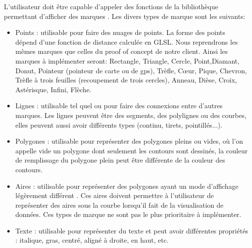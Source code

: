 \documentclass[12pt]{article}
\begin{document}
L'utilisateur doit être capable d'appeler des fonctions de la bibliothèque permettant d'afficher des
\gls{marque}s \cite{VegaMarks}. Les divers types de marque sont les suivants:
	\begin{itemize}
	\item Points : utilisable pour faire des nuages de points. La forme des points dépend d'une fonction de
    distance calculée en GLSL. Nous reprendrons les mêmes marques que celles du proof of concept de notre client.
    Ainsi les marques à implémenter seront: Rectangle, Triangle, Cercle, Point,Diamant, Donut, Pointeur (pointeur de carte ou de gps), Trèfle, Cœur, 			Pique, Chevron, Trèfle à trois feuilles (recoupement de trois cercles), Anneau, Dièse, Croix, Astérisque, Infini, Flèche. 
    \item Lignes : utilisable tel quel ou pour faire des connexions entre d'autres marques. Les lignes
    peuvent être des segments, des polylignes ou des courbes, elles peuvent aussi avoir différents types
    (continu, tirets, pointillés...). 
    \item Polygones : utilisable pour représenter des polygones pleins ou vides, où l'on appelle vide un 
    polygone dont seulement les contours sont dessinés, la couleur de remplissage du polygone plein peut être
    différente de la couleur des contours. 
    \item Aires : utilisable pour représenter des polygones ayant un mode d'affichage légèrement différent
    \cite{VegaMarks}. Ces aires doivent permettre à l'utilisateur de représenter des aires sous la courbe lorsqu'il fait de la
    visualisation de données. Ces types de marque ne sont pas le plus prioritaire à implémenter.
    \item Texte : utilisable pour représenter du texte et peut avoir différentes propriétés : italique,
    gras, centré, aligné à droite, en haut, etc.
    \end{itemize}
\end{document}
